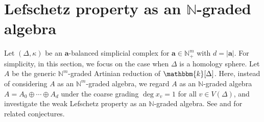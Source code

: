 \section{Lefschetz property as an \texorpdfstring{$\mathbb{N}$}{N}-graded algebra}
Let $(\Delta,\kappa)$ be an $\bm{a}$-balanced simplicial complex for $\bm{a}\in\mathbb{N}_+^m$ with $d=|\bm{a}|$.
For simplicity, in this section, we focus on the case when $\Delta$ is a homology sphere.
Let $A$ be the generic $\mathbb{N}^m$-graded Artinian reduction of $\mathbbm{k}[\Delta]$.
Here, instead of considering $A$ as an $\mathbb{N}^m$-graded algebra, we regard $A$ as an $\mathbb{N}$-graded algebra $A=A_0\oplus\cdots\oplus A_d$ under the coarse grading $\deg x_v=1$ for all $v \in V(\Delta)$, and investigate the weak Lefschetz property as an $\mathbb{N}$-graded algebra.
See \cite[Conjecture 1.3]{CJMN} and \cite[Conjecture 1.1]{Oba} for related conjectures.

